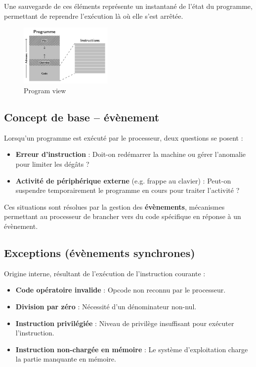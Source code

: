 Une sauvegarde de ces éléments représente un instantané de l'état du programme, permettant de reprendre l'exécution là où elle s'est arrêtée.

\begin{figure}[h]
    \centering
    \includegraphics[width=0.4\textwidth]{Images/View/program-view.png}
    \caption{Program view}
\end{figure}

\subsection{Concept de base – évènement}

Lorsqu’un programme est exécuté par le processeur, deux questions se posent :
\begin{itemize}
    \item \textbf{Erreur d'instruction} : Doit-on redémarrer la machine ou gérer l’anomalie pour limiter les dégâts ?
    \item \textbf{Activité de périphérique externe} (e.g. frappe au clavier) : Peut-on suspendre temporairement le programme en cours pour traiter l’activité ?
\end{itemize}

Ces situations sont résolues par la gestion des \textbf{évènements}, mécanismes permettant au processeur de brancher vers du code spécifique en réponse à un évènement.

\subsection{Exceptions (évènements synchrones)}
Origine interne, résultant de l’exécution de l’instruction courante :
\begin{itemize}
    \item \textbf{Code opératoire invalide} : Opcode non reconnu par le processeur.
    \item \textbf{Division par zéro} : Nécessité d’un dénominateur non-nul.
    \item \textbf{Instruction privilégiée} : Niveau de privilège insuffisant pour exécuter l’instruction.
    \item \textbf{Instruction non-chargée en mémoire} : Le système d’exploitation charge la partie manquante en mémoire.
\end{itemize}

